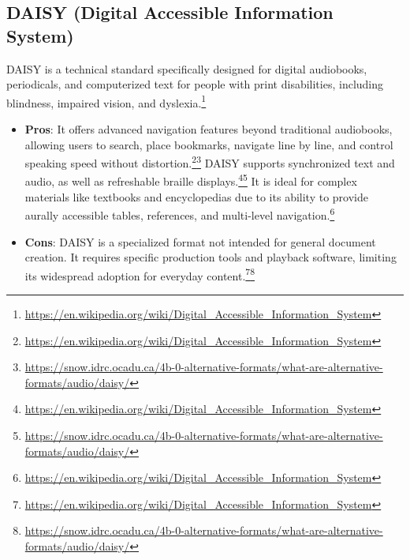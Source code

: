 \subsection{DAISY (Digital Accessible Information System)}
DAISY is a technical standard specifically designed for digital audiobooks, periodicals, and computerized text for people with print disabilities, including blindness, impaired vision, and dyslexia.\footnote{\url{https://en.wikipedia.org/wiki/Digital_Accessible_Information_System}}
\begin{itemize}[noitemsep,topsep=0pt]
    \item \textbf{Pros}: It offers advanced navigation features beyond traditional audiobooks, allowing users to search, place bookmarks, navigate line by line, and control speaking speed without distortion.\footnote{\url{https://en.wikipedia.org/wiki/Digital_Accessible_Information_System}}\footnote{\url{https://snow.idrc.ocadu.ca/4b-0-alternative-formats/what-are-alternative-formats/audio/daisy/}} DAISY supports synchronized text and audio, as well as refreshable braille displays.\footnote{\url{https://en.wikipedia.org/wiki/Digital_Accessible_Information_System}}\footnote{\url{https://snow.idrc.ocadu.ca/4b-0-alternative-formats/what-are-alternative-formats/audio/daisy/}} It is ideal for complex materials like textbooks and encyclopedias due to its ability to provide aurally accessible tables, references, and multi-level navigation.\footnote{\url{https://en.wikipedia.org/wiki/Digital_Accessible_Information_System}}
    \item \textbf{Cons}: DAISY is a specialized format not intended for general document creation. It requires specific production tools and playback software, limiting its widespread adoption for everyday content.\footnote{\url{https://en.wikipedia.org/wiki/Digital_Accessible_Information_System}}\footnote{\url{https://snow.idrc.ocadu.ca/4b-0-alternative-formats/what-are-alternative-formats/audio/daisy/}}
\end{itemize}

